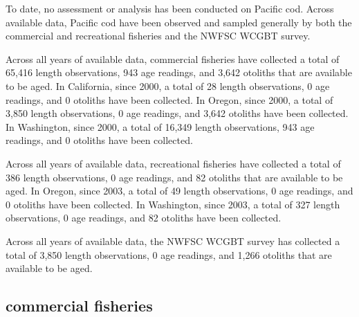 \documentclass[11pt,
  english,
  letterpaper,
]{article}
\begin{document}
\leavevmode\tagmcend\tagstructend


To date, no assessment or analysis has been conducted on Pacific cod. Across available data, Pacific cod have been observed and sampled generally by both the commercial and recreational fisheries and the NWFSC WCGBT survey.

\leavevmode\tagmcend\tagstructend\par


Across all years of available data, commercial fisheries have collected a total of 65,416 length observations, 943 age readings, and 3,642 otoliths that are available to be aged. In California, since 2000, a total of 28 length observations, 0 age readings, and 0 otoliths have been collected. In Oregon, since 2000, a total of 3,850 length observations, 0 age readings, and 3,642 otoliths have been collected. In Washington, since 2000, a total of 16,349 length observations, 943 age readings, and 0 otoliths have been collected.

\leavevmode\tagmcend\tagstructend\par


Across all years of available data, recreational fisheries have collected a total of 386 length observations, 0 age readings, and 82 otoliths that are available to be aged. In Oregon, since 2003, a total of 49 length observations, 0 age readings, and 0 otoliths have been collected. In Washington, since 2003, a total of 327 length observations, 0 age readings, and 82 otoliths have been collected.

\leavevmode\tagmcend\tagstructend\par


Across all years of available data, the NWFSC WCGBT survey has collected a total of 3,850 length observations, 0 age readings, and 1,266 otoliths that are available to be aged.

\leavevmode\tagmcend\tagstructend\par


\hypertarget{commercial-fisheries-32}{%
\subsection{commercial fisheries}\label{commercial-fisheries-32}}
\end{document}
